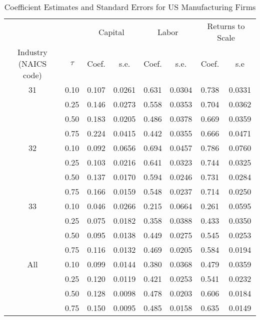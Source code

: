 \begin{table}[ht]
\centering
\caption{Coefficient Estimates and Standard Errors for US Manufacturing Firms} 
\begin{tabular}{cccccccc}
  \hline\hline & & \multicolumn{2}{c}{Capital}  & \multicolumn{2}{c}{Labor} & \multicolumn{2}{c}{Returns to Scale} \\ \cmidrule(lr){3-4} \cmidrule(lr){5-6} \cmidrule(lr){7-8}Industry (NAICS code) & $\tau$ & Coef. & s.e. & Coef. & s.e. & Coef. & s.e \\ 
  \hline
31 & 0.10 & 0.107 & 0.0261 & 0.631 & 0.0304 & 0.738 & 0.0331 \\ 
   & 0.25 & 0.146 & 0.0273 & 0.558 & 0.0353 & 0.704 & 0.0362 \\ 
   & 0.50 & 0.183 & 0.0205 & 0.486 & 0.0378 & 0.669 & 0.0359 \\ 
   & 0.75 & 0.224 & 0.0415 & 0.442 & 0.0355 & 0.666 & 0.0471 \\ 
  32 & 0.10 & 0.092 & 0.0656 & 0.694 & 0.0457 & 0.786 & 0.0760 \\ 
   & 0.25 & 0.103 & 0.0216 & 0.641 & 0.0323 & 0.744 & 0.0325 \\ 
   & 0.50 & 0.137 & 0.0170 & 0.594 & 0.0246 & 0.731 & 0.0284 \\ 
   & 0.75 & 0.166 & 0.0159 & 0.548 & 0.0237 & 0.714 & 0.0250 \\ 
  33 & 0.10 & 0.046 & 0.0266 & 0.215 & 0.0664 & 0.261 & 0.0595 \\ 
   & 0.25 & 0.075 & 0.0182 & 0.358 & 0.0388 & 0.433 & 0.0350 \\ 
   & 0.50 & 0.095 & 0.0138 & 0.449 & 0.0275 & 0.545 & 0.0253 \\ 
   & 0.75 & 0.116 & 0.0132 & 0.469 & 0.0205 & 0.584 & 0.0194 \\ 
  All & 0.10 & 0.099 & 0.0144 & 0.380 & 0.0368 & 0.479 & 0.0359 \\ 
   & 0.25 & 0.120 & 0.0119 & 0.421 & 0.0253 & 0.541 & 0.0232 \\ 
   & 0.50 & 0.128 & 0.0098 & 0.478 & 0.0203 & 0.606 & 0.0184 \\ 
   & 0.75 & 0.150 & 0.0095 & 0.485 & 0.0158 & 0.635 & 0.0149 \\ 
   \hline
\end{tabular}
\end{table}
